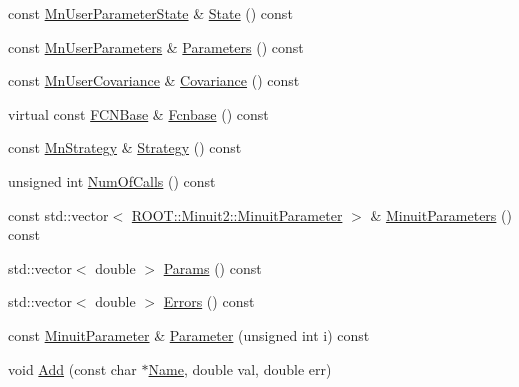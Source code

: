 \begin{DoxyCompactItemize}
const \mbox{\hyperlink{classROOT_1_1Minuit2_1_1MnUserParameterState}{Mn\+User\+Parameter\+State}} \& \mbox{\hyperlink{classROOT_1_1Minuit2_1_1MnApplication_ac82c0ac40ced7cf8904dc702a79512f7}{State}} () const
\item 
const \mbox{\hyperlink{classROOT_1_1Minuit2_1_1MnUserParameters}{Mn\+User\+Parameters}} \& \mbox{\hyperlink{classROOT_1_1Minuit2_1_1MnApplication_a8a6af4bd7d2f8af8524bca7a67b2f62d}{Parameters}} () const
\item 
const \mbox{\hyperlink{classROOT_1_1Minuit2_1_1MnUserCovariance}{Mn\+User\+Covariance}} \& \mbox{\hyperlink{classROOT_1_1Minuit2_1_1MnApplication_abd83494a6b9b808683edc162c28a9888}{Covariance}} () const
\item 
virtual const \mbox{\hyperlink{classROOT_1_1Minuit2_1_1FCNBase}{F\+C\+N\+Base}} \& \mbox{\hyperlink{classROOT_1_1Minuit2_1_1MnApplication_af4eb3fe4927d3a8e0efcd5c6b7100881}{Fcnbase}} () const
\item 
const \mbox{\hyperlink{classROOT_1_1Minuit2_1_1MnStrategy}{Mn\+Strategy}} \& \mbox{\hyperlink{classROOT_1_1Minuit2_1_1MnApplication_ad4eba6a0369cc3fa9ce9b676582a77a7}{Strategy}} () const
\item 
unsigned int \mbox{\hyperlink{classROOT_1_1Minuit2_1_1MnApplication_a089843f663ccb31fcca2e58016ec7e9d}{Num\+Of\+Calls}} () const
\item 
const std\+::vector$<$ \mbox{\hyperlink{classROOT_1_1Minuit2_1_1MinuitParameter}{R\+O\+O\+T\+::\+Minuit2\+::\+Minuit\+Parameter}} $>$ \& \mbox{\hyperlink{classROOT_1_1Minuit2_1_1MnApplication_a415948149d0f79b43adccc1cb7040e10}{Minuit\+Parameters}} () const
\item 
std\+::vector$<$ double $>$ \mbox{\hyperlink{classROOT_1_1Minuit2_1_1MnApplication_ad4a7808d299103c748b01bd9c2f5b91d}{Params}} () const
\item 
std\+::vector$<$ double $>$ \mbox{\hyperlink{classROOT_1_1Minuit2_1_1MnApplication_a2a4c39064eb247a464476b6309816282}{Errors}} () const
\item 
const \mbox{\hyperlink{classROOT_1_1Minuit2_1_1MinuitParameter}{Minuit\+Parameter}} \& \mbox{\hyperlink{classROOT_1_1Minuit2_1_1MnApplication_a96f1a9c26e3f8c0de67e3680b127c7c1}{Parameter}} (unsigned int i) const
\item 
void \mbox{\hyperlink{classROOT_1_1Minuit2_1_1MnApplication_a2912c94b7cb69b29862e1e41ffbc4542}{Add}} (const char $\ast$\mbox{\hyperlink{classROOT_1_1Minuit2_1_1MnApplication_ad333315ce51772fef3094491b37f309d}{Name}}, double val, double err)
\item 

\end{DoxyCompactItemize}
